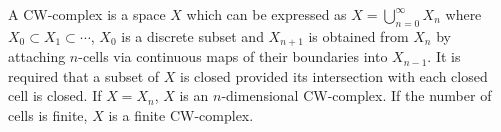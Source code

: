 A CW-complex is a space $X$ which can be expressed as $X = \bigcup_{n=0}^{\infty} X_n$ where $X_0 \subset X_1 \subset \cdots$, $X_0$ is a discrete subset and $X_{n+1}$ is obtained from $X_n$ by attaching $n$-cells via continuous maps of their boundaries into $X_{n-1}$. It is required that a subset of $X$ is closed provided its intersection with each closed cell is closed. If $X = X_n$, $X$ is an $n$-dimensional CW-complex. If the number of cells is finite, $X$ is a finite CW-complex.
